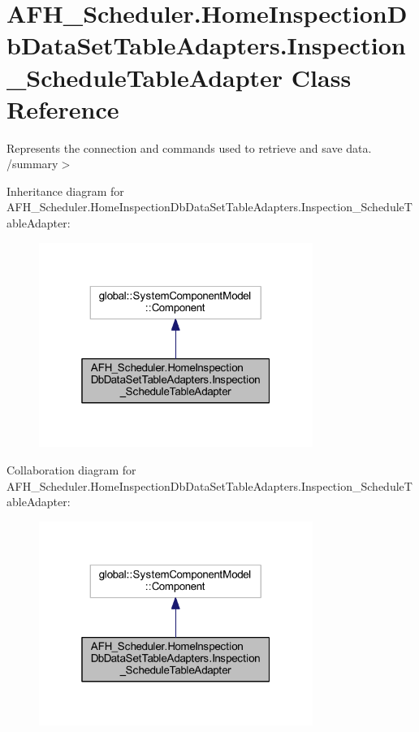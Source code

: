 \section{A\+F\+H\+\_\+\+Scheduler.\+Home\+Inspection\+Db\+Data\+Set\+Table\+Adapters.\+Inspection\+\_\+\+Schedule\+Table\+Adapter Class Reference}
\label{class_a_f_h___scheduler_1_1_home_inspection_db_data_set_table_adapters_1_1_inspection___schedule_table_adapter}


Represents the connection and commands used to retrieve and save data. /summary$>$  




Inheritance diagram for A\+F\+H\+\_\+\+Scheduler.\+Home\+Inspection\+Db\+Data\+Set\+Table\+Adapters.\+Inspection\+\_\+\+Schedule\+Table\+Adapter\+:
\nopagebreak
\begin{figure}[H]
\begin{center}
\leavevmode
\includegraphics[width=253pt]{class_a_f_h___scheduler_1_1_home_inspection_db_data_set_table_adapters_1_1_inspection___schedule_table_adapter__inherit__graph}
\end{center}
\end{figure}


Collaboration diagram for A\+F\+H\+\_\+\+Scheduler.\+Home\+Inspection\+Db\+Data\+Set\+Table\+Adapters.\+Inspection\+\_\+\+Schedule\+Table\+Adapter\+:
\nopagebreak
\begin{figure}[H]
\begin{center}
\leavevmode
\includegraphics[width=253pt]{class_a_f_h___scheduler_1_1_home_inspection_db_data_set_table_adapters_1_1_inspection___schedule_table_adapter__coll__graph}
\end{center}
\end{figure}
